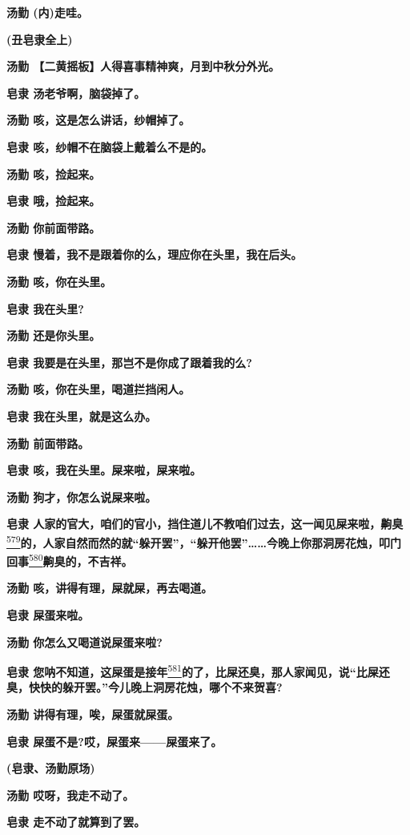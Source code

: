 \textbf{汤勤 (内)走哇。}

\textbf{(丑皂隶全上)}

\textbf{汤勤 【二黄摇板】人得喜事精神爽，月到中秋分外光。}

\textbf{皂隶 汤老爷啊，脑袋掉了。}

\textbf{汤勤 咳，这是怎么讲话，纱帽掉了。}

\textbf{皂隶 咳，纱帽不在脑袋上戴着么不是的。}

\textbf{汤勤 咳，捡起来。}

\textbf{皂隶 哦，捡起来。}

\textbf{汤勤 你前面带路。}

\textbf{皂隶 慢着，我不是跟着你的么，理应你在头里，我在后头。}

\textbf{汤勤 咳，你在头里。}

\textbf{皂隶 我在头里?}

\textbf{汤勤 还是你头里。}

\textbf{皂隶 我要是在头里，那岂不是你成了跟着我的么?}

\textbf{汤勤 咳，你在头里，喝道拦挡闲人。}

\textbf{皂隶 我在头里，就是这么办。}

\textbf{汤勤 前面带路。}

\textbf{皂隶 咳，我在头里。屎来啦，屎来啦。}

\textbf{汤勤 狗才，你怎么说屎来啦。}

\textbf{皂隶
人家的官大，咱们的官小，挡住道儿不教咱们过去，这一闻见屎来啦，齁臭}\protect\hyperlink{fn579}{\textsuperscript{579}}\textbf{的，人家自然而然的就``躲开罢''，``躲开他罢''\ldots{}\ldots{}今晚上你那洞房花烛，叩门回事}\protect\hyperlink{fn580}{\textsuperscript{580}}\textbf{齁臭的，不吉祥。}

\textbf{汤勤 咳，讲得有理，屎就屎，再去喝道。}

\textbf{皂隶 屎蛋来啦。}

\textbf{汤勤 你怎么又喝道说屎蛋来啦?}

\textbf{皂隶
您呐不知道，这屎蛋是接年}\protect\hyperlink{fn581}{\textsuperscript{581}}\textbf{的了，比屎还臭，那人家闻见，说``比屎还臭，快快的躲开罢。''今儿晚上洞房花烛，哪个不来贺喜?}

\textbf{汤勤 讲得有理，唉，屎蛋就屎蛋。}

\textbf{皂隶 屎蛋不是?哎，屎蛋来------屎蛋来了。}

\textbf{(皂隶、汤勤原场)}

\textbf{汤勤 哎呀，我走不动了。}

\textbf{皂隶 走不动了就算到了罢。}

